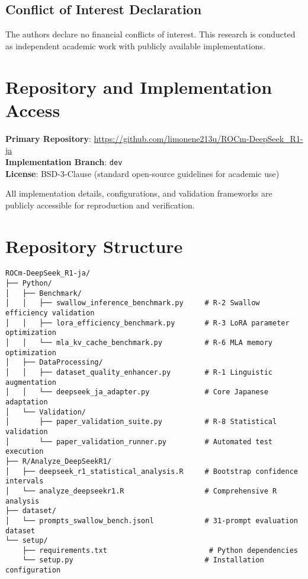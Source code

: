 \documentclass[12pt,a4paper]{article}
\begin{document}
\subsection{Conflict of Interest Declaration}

The authors declare no financial conflicts of interest. This research is conducted as independent academic work with publicly available implementations.

\section{Repository and Implementation Access}

\textbf{Primary Repository}: \url{https://github.com/limonene213u/ROCm-DeepSeek_R1-ja}\\
\textbf{Implementation Branch}: \texttt{dev}\\
\textbf{License}: BSD-3-Clause (standard open-source guidelines for academic use)

All implementation details, configurations, and validation frameworks are publicly accessible for reproduction and verification.

\newpage

\appendix

\section{Repository Structure}

\begin{lstlisting}[basicstyle=\ttfamily\footnotesize]
ROCm-DeepSeek_R1-ja/
├── Python/
│   ├── Benchmark/
│   │   ├── swallow_inference_benchmark.py     # R-2 Swallow efficiency validation
│   │   ├── lora_efficiency_benchmark.py       # R-3 LoRA parameter optimization
│   │   └── mla_kv_cache_benchmark.py          # R-6 MLA memory optimization
│   ├── DataProcessing/
│   │   ├── dataset_quality_enhancer.py        # R-1 Linguistic augmentation
│   │   └── deepseek_ja_adapter.py             # Core Japanese adaptation
│   └── Validation/
│       ├── paper_validation_suite.py          # R-8 Statistical validation
│       └── paper_validation_runner.py         # Automated test execution
├── R/Analyze_DeepSeekR1/
│   ├── deepseek_r1_statistical_analysis.R     # Bootstrap confidence intervals
│   └── analyze_deepseekr1.R                   # Comprehensive R analysis
├── dataset/
│   └── prompts_swallow_bench.jsonl            # 31-prompt evaluation dataset
└── setup/
    ├── requirements.txt                        # Python dependencies
    └── setup.py                               # Installation configuration
\end{lstlisting}
\end{document}
